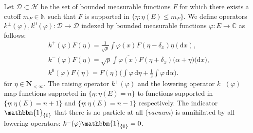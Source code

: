 \documentclass[pdftex]{sigma}
\numberwithin{equation}{section}
\newcommand{\N}{\mathbb{N}}
\newcommand{\C}{\mathbb{C}}
\newcommand{\dd}{\mathrm{d}} %
\newcommand{\1}{\mathbbm{1}}
\begin{document}
Let $\mathcal D\subset \mathcal H$ be the set of bounded measurable functions $F$ for which there exists a cutoff $ m_F \in \N$ such that $F$ is supported in $\{\eta\colon \eta(E)\leq m_F\}$. We define operators $k^\pm(\varphi),k^0(\varphi)\colon\mathcal D\to \mathcal D$ indexed by bounded measurable functions $\varphi\colon E\to \C$ as follows:
\begin{align*}
	&k^+(\varphi) F(\eta) = \frac{1}{\sqrt p} \int \varphi(x) F(\eta-\delta_x) \eta(\dd x),\\
 &k^-(\varphi) F(\eta) = \sqrt{p} \int \overline{\varphi(x)} F(\eta+\delta_x) \bigl(\alpha+\eta)\bigr(\dd x),\\
	&k^0(\varphi) F(\eta) = F(\eta) \biggl( \int \varphi\,\dd \eta+ \frac12 \int \varphi \,\dd \alpha \biggr).
\end{align*}
for $\eta \in \mathbf{N}_{<\infty}$.
The raising operator $k^+(\varphi)$ and the lowering operator $k^-(\varphi)$ map functions supported in $\{\eta\colon \eta(E) = n\}$ to functions supported in $\{\eta\colon \eta(E) =n+1\}$ and $\{\eta\colon \eta(E) =n-1\}$ respectively. The indicator $\1_{\{0\}}$ that there is no particle at all (\emph{vacuum}) is annihilated by all lowering operators: $k^-(\varphi) \1_{\{0\}}=0$.
\end{document}

